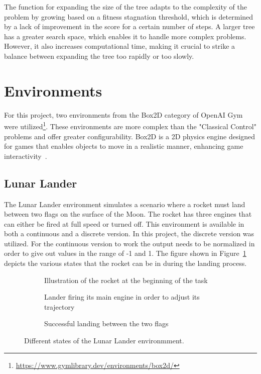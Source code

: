 The function for expanding the size of the tree adapts to the complexity of the problem by growing based on a fitness stagnation threshold, which is determined by a lack of improvement in the score for a certain number of steps. A larger tree has a greater search space, which enables it to handle more complex problems. However, it also increases computational time, making it crucial to strike a balance between expanding the tree too rapidly or too slowly.

\section{Environments}

For this project, two environments from the Box2D category of OpenAI Gym were utilized\footnote{\url{https://www.gymlibrary.dev/environments/box2d/}}. These environments are more complex than the "Classical Control" problems and offer greater configurability. Box2D is a 2D physics engine designed for games that enables objects to move in a realistic manner, enhancing game interactivity~\cite{noauthor_box2d_nodate}.

\subsection{Lunar Lander}
The Lunar Lander environment simulates a scenario where a rocket must land between two flags on the surface of the Moon. The rocket has three engines that can either be fired at full speed or turned off. This environment is available in both a continuous and a discrete version. In this project, the discrete version was utilized. For the continuous version to work the output needs to be normalized in order to give out values in the range of -1 and 1. The figure shown in Figure~\ref{fig:lunar_lander} depicts the various states that the rocket can be in during the landing process.

\begin{figure}[!ht]
    \centering
    \begin{subfigure}{.32\textwidth}
        \centering
        \caption{Illustration of the rocket at the beginning of the task}
    \end{subfigure}
    \hspace{1em}
    \begin{subfigure}{.32\textwidth}
        \centering
        \caption{Lander firing its main engine in order to adjust its trajectory}
    \end{subfigure}
    \hspace{1em}
    \begin{subfigure}{.32\textwidth}
        \centering
        \caption{Successful landing between the two flags}
    \end{subfigure}
    \caption{Different states of the Lunar Lander environmment.}
    \label{fig:lunar_lander}
\end{figure}

